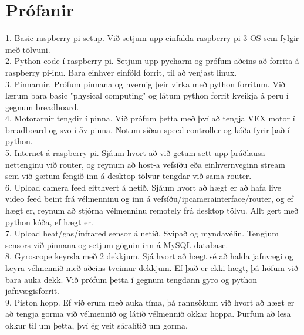 \section{Prófanir}
\LARGE{
1. Basic raspberry pi setup. Við setjum upp einfalda raspberry pi 3 OS sem fylgir með tölvuni.\\

2. Python code í raspberry pi. Setjum upp pycharm og prófum aðeins að forrita á raspberry pi-inu. Bara einhver einföld forrit, til að venjast linux.\\

3. Pinnarnir. Prófum pinnana og hvernig þeir virka með python forritum. Við lærum bara basic "physical computing" og látum python forrit kveikja á peru í gegnum breadboard.\\

4. Motorarnir tengdir í pinna. Við prófum þetta með því að tengja VEX motor í breadboard og svo í 5v pinna. Notum síðan speed controller og kóða fyrir það í python.\\

5. Internet á raspberry pi. Sjáum hvort að við getum sett upp þráðlausa nettenginu við router, og reynum að host-a vefsíðu eða einhvernveginn stream sem við gætum fengið inn á desktop tölvur tengdar við sama router.\\

6. Upload camera feed eitthvert á netið. Sjáum hvort að hægt er að hafa live video feed beint frá vélmenninu og inn á vefsíðu/ipcamerainterface/router, og ef hægt er, reynum að stjórna vélmenninu remotely frá desktop tölvu. Allt gert með python kóða, ef hægt er.\\

7. Upload heat/gas/infrared sensor á netið. Svipað og myndavélin. Tengjum sensors við pinnana og setjum gögnin inn á MySQL database.\\

8. Gyroscope keyrsla með 2 dekkjum. Sjá hvort að hægt sé að halda jafnvægi og keyra vélmennið með aðeins tveimur dekkjum. Ef það er ekki hægt, þá höfum við bara auka dekk. Við prófum þetta í gegnum tengdann gyro og python jafnvægisforrit.\\

9. Piston hopp. Ef við erum með auka tíma, þá rannsökum við hvort að hægt er að tengja gorma við vélmennið og látið vélmennið okkar hoppa. Þurfum að lesa okkur til um þetta, því ég veit sáralítið um gorma.\\
}
